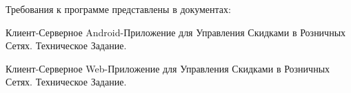 Требования к программе представлены в документах:
\begin{my_enumerate}
    \item Клиент-Серверное Android-Приложение для Управления Скидками в Розничных Сетях. Техническое Задание.
    \item Клиент-Серверное Web-Приложение для Управления Скидками в Розничных Сетях. Техническое Задание.
\end{my_enumerate}



